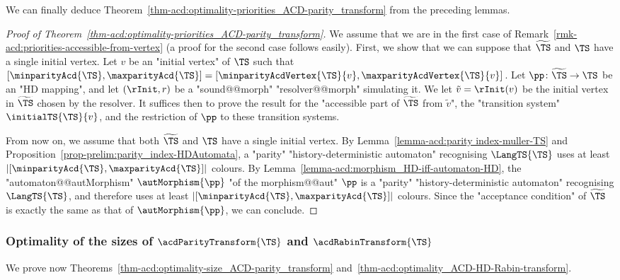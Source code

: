 \documentclass[10pt,a4paper]{amsart}
\begin{document}
We can finally deduce Theorem~\ref{thm-acd:optimality-priorities_ACD-parity_transform} from the preceding lemmas.
\begin{proof}[Proof of Theorem~\ref{thm-acd:optimality-priorities_ACD-parity_transform}]
	We assume that we are in the first case of Remark~\ref{rmk-acd:priorities-accessible-from-vertex} (a proof for the second case follows easily). First, we show that we can suppose that $\widetilde{\TS}$ and $\TS$ have a single initial vertex. Let $v$ be an "initial vertex" of $\TS$ such that $[\minparityAcd{\TS}, \maxparityAcd{\TS}] = [\minparityAcdVertex{\TS}{v}, \maxparityAcdVertex{\TS}{v}]$. 
	Let $\pp\colon \widetilde{\TS} \to \TS$ be an "HD mapping", and let $(\rInit, r)$ be a "sound@@morph" "resolver@@morph" simulating it. We let $\tilde{v} = \rInit(v)$ be the initial vertex in $\widetilde{\TS}$ chosen by the resolver. It suffices then to prove the result for the "accessible part of $\widetilde{\TS}$ from $\tilde{v}$", the "transition system" $\initialTS{\TS}{v}$,  and the restriction of $\pp$ to these transition systems. 
	
	From now on, we assume that both $\widetilde{\TS}$ and $\TS$ have a single initial vertex.
	By Lemma~\ref{lemma-acd:parity index-muller-TS} and Proposition~\ref{prop-prelim:parity_index-HDAutomata}, a "parity" "history-deterministic automaton" recognising $\LangTS{\TS}$ uses at least $|[\minparityAcd{\TS}, \maxparityAcd{\TS}]|$ colours. By Lemma~\ref{lemma-acd:morphism_HD-iff-automaton-HD}, the "automaton@@autMorphism" $\autMorphism{\pp}$ "of the morphism@@aut" $\pp$ is a "parity" "history-deterministic automaton" recognising $\LangTS{\TS}$, and therefore uses at least $|[\minparityAcd{\TS}, \maxparityAcd{\TS}]|$ colours. Since the "acceptance condition" of $\widetilde{\TS}$ is exactly the same as that of $\autMorphism{\pp}$, we can conclude.
\end{proof}


\subsubsection{Optimality of the sizes \texorpdfstring{of $\acdParityTransform{\TS}$ and $\acdRabinTransform{\TS}$}{}}
We prove now Theorems~\ref{thm-acd:optimality-size_ACD-parity_transform} and~\ref{thm-acd:optimality_ACD-HD-Rabin-transform}. 
\end{document}
